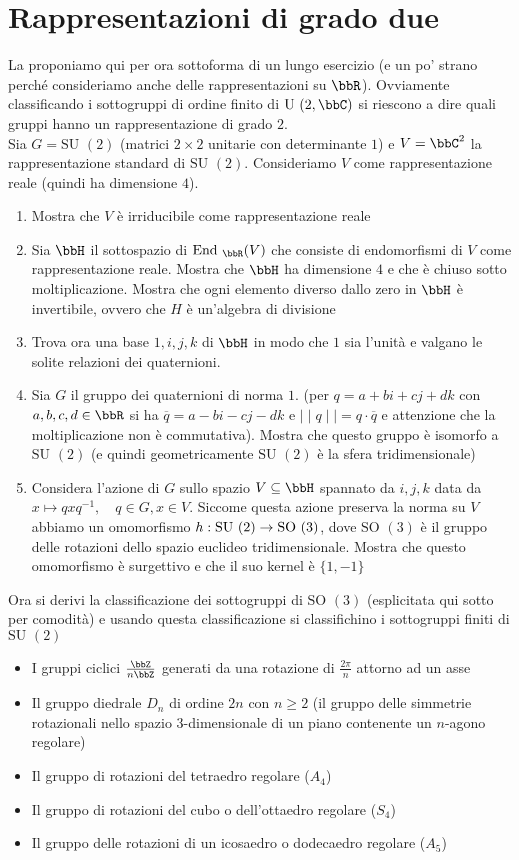 \documentclass[a4paper,NoNotes,GeneralMath]{stdmdoc}
\newcommand{\SU}{\text{SU }}
\newcommand{\U}{\text{U }}
\newcommand{\SO}{\text{SO }}
\begin{document}
	\section{Rappresentazioni di grado due}
	La proponiamo qui per ora sottoforma di un lungo esercizio (e un po' strano perché consideriamo anche delle rappresentazioni su $\bbR$). Ovviamente classificando i sottogruppi di ordine finito di $\U(2, \bbC)$ si riescono a dire quali gruppi hanno un rappresentazione di grado $2$. \\
	Sia $G = \SU(2)$ (matrici $2\times 2$ unitarie con determinante $1$) e $V = \bbC^2$ la rappresentazione standard di $\SU(2)$. Consideriamo $V$ come rappresentazione reale (quindi ha dimensione $4$).
	\begin{enumerate}
		\item Mostra che $V$ è irriducibile come rappresentazione reale
		\item Sia $\bbH$ il sottospazio di $\End_\bbR(V)$ che consiste di endomorfismi di $V$ come rappresentazione reale. Mostra che $\bbH$ ha dimensione $4$ e che è chiuso sotto moltiplicazione. Mostra che ogni elemento diverso dallo zero in $\bbH$ è invertibile, ovvero che $H$ è un'algebra di divisione
		\item Trova ora una base $1, i, j, k$ di $\bbH$ in modo che $1$ sia l'unità e valgano le solite relazioni dei quaternioni.
		\item Sia $G$ il gruppo dei quaternioni di norma $1$. (per $q = a + bi + cj + dk$ con $a, b, c, d \in \bbR$ si ha $\overline{q} = a - bi - cj - dk$ e $\mid\mid{q}\mid\mid = q \cdot \overline{q}$ e attenzione che la moltiplicazione non è commutativa). Mostra che questo gruppo è isomorfo a $\SU(2)$ (e quindi geometricamente $\SU(2)$ è la sfera tridimensionale)
		\item Considera l'azione di $G$ sullo spazio $V \subseteq \bbH$ spannato da $i, j, k$ data da $x \mapsto qxq^{-1}, \quad q \in G, x \in V$. Siccome questa azione preserva la norma su $V$ abbiamo un omomorfismo $h: \SU(2) \rar \SO(3)$, dove $\SO(3)$ è il gruppo delle rotazioni dello spazio euclideo tridimensionale. Mostra che questo omomorfismo è surgettivo e che il suo kernel è $\{1, -1\}$
	\end{enumerate}
	Ora si derivi la classificazione dei sottogruppi di $\SO(3)$ (esplicitata qui sotto per comodità) e usando questa classificazione si classifichino i sottogruppi finiti di $\SU(2)$
	\begin{itemize}
		\item I gruppi ciclici $\frac{\bbZ}{n\bbZ}$ generati da una rotazione di $\frac{2\pi}{n}$ attorno ad un asse
		\item Il gruppo diedrale $D_n$ di ordine $2n$ con $n \ge 2$ (il gruppo delle simmetrie rotazionali nello spazio $3$-dimensionale di un piano contenente un $n$-agono regolare)
		\item Il gruppo di rotazioni del tetraedro regolare ($A_4$)
		\item Il gruppo di rotazioni del cubo o dell'ottaedro regolare ($S_4$)
		\item Il gruppo delle rotazioni di un icosaedro o dodecaedro regolare ($A_5$)
	\end{itemize}
\end{document}
